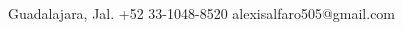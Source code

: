 \documentclass[lighthipster]{simplehipstercv}
\newlength{\rightcolwidth}
\begin{document}
\begin{paracol}{2}
\vfill{} %

\setlength{\parindent}{0pt}
\begin{minipage}[t]{\rightcolwidth}
\begin{center}\fontfamily{\sfdefault}\selectfont \color{black!70} %
{\small {} Guadalajara, Jal.  +52 33-1048-8520   alexisalfaro505@gmail.com
}
\end{center}
\end{minipage}

\end{paracol}
\end{document}
